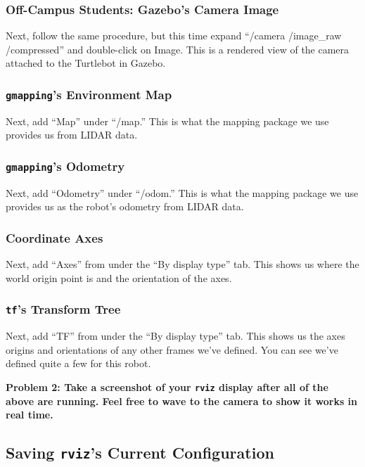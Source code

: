 \documentclass{article}
\begin{document}
\subsubsection{Off-Campus Students: Gazebo's Camera Image}

Next, follow the same procedure, but this time expand ``/camera /image\_raw /compressed'' and double-click on Image. This is a rendered view of the camera attached to the Turtlebot in Gazebo.

\subsubsection{\texttt{gmapping}'s Environment Map}

Next, add ``Map'' under ``/map.'' This is what the mapping package we use provides us from LIDAR data.

\subsubsection{\texttt{gmapping}'s Odometry}

Next, add ``Odometry'' under ``/odom.'' This is what the mapping package we use provides us as the robot's odometry from LIDAR data.

\subsubsection{Coordinate Axes}

Next, add ``Axes'' from under the ``By display type'' tab. This shows us where the world origin point is and the orientation of the axes.

\subsubsection{\texttt{tf}'s Transform Tree}

Next, add ``TF'' from under the ``By display type'' tab. This shows us the axes origins and orientations of any other frames we've defined. You can see we've defined quite a few for this robot.

{\bf Problem 2: Take a screenshot of your \texttt{rviz} display after all of the above are running. Feel free to wave to the camera to show it works in real time.}

\subsection{Saving \texttt{rviz}'s Current Configuration}
\end{document}
